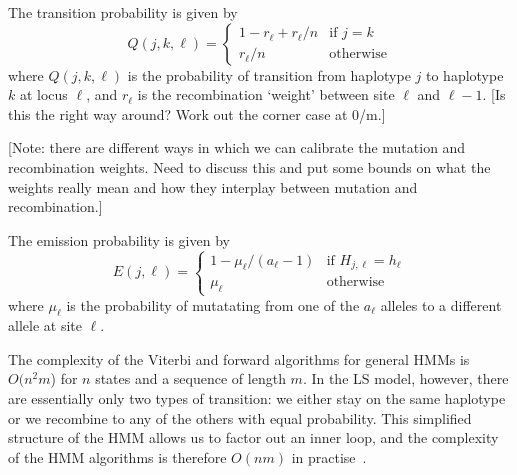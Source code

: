 \documentclass{article}
\begin{document}
The transition probability is given by
\begin{equation}\label{eq-recomb-proba}
Q(j, k, \ell) = \begin{cases}
1 - r_\ell + r_\ell / n & \text{if $j = k$} \\
r_\ell / n & \text{otherwise}
\end{cases}
\end{equation}
where $Q(j, k, \ell)$ is the probability of transition from haplotype $j$
to haplotype $k$ at locus $\ell$, and $r_\ell$ is the recombination `weight'
between site $\ell$ and $\ell - 1$. [Is this the right way around? Work out
the corner case at 0/m.]


[Note: there are different ways in which we can calibrate the mutation and
recombination weights. Need to discuss this and put some bounds on what
the weights really mean and how they interplay between mutation and
recombination.]

The emission probability is given by
\begin{equation}\label{eq-mut-proba}
E(j, \ell) = \begin{cases}
1 - \mu_\ell / (a_\ell - 1)  & \text{if $H_{j, \ell} = h_{\ell}$} \\
\mu_\ell & \text{otherwise}
\end{cases}
\end{equation}
where $\mu_\ell$ is the probability of mutatating from one of the
$a_\ell$ alleles to a different allele at site $\ell$.

The complexity of the Viterbi and forward algorithms for general HMMs
is $O(n^2 m$) for $n$ states and a sequence of length $m$. In the
LS model, however, there are essentially only two types of transition:
we either stay on the same haplotype or we recombine to any of the
others with equal probability. This simplified structure of the HMM
allows us to factor out an inner loop, and the complexity of the
HMM algorithms is therefore $O(n m)$ in practise~\citep{lunter2018haplotype,
rosen2018average}.
\end{document}

